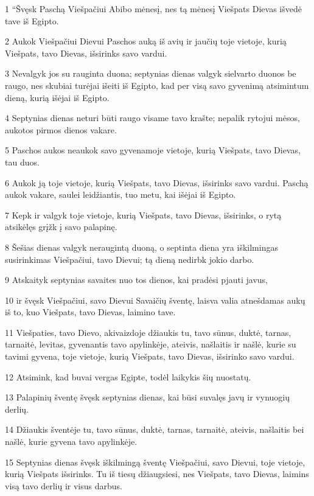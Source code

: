 \par 1 “Švęsk Paschą Viešpačiui Abibo mėnesį, nes tą mėnesį Viešpats Dievas išvedė tave iš Egipto. 
\par 2 Aukok Viešpačiui Dievui Paschos auką iš avių ir jaučių toje vietoje, kurią Viešpats, tavo Dievas, išsirinks savo vardui. 
\par 3 Nevalgyk jos su rauginta duona; septynias dienas valgyk sielvarto duonos be raugo, nes skubiai turėjai išeiti iš Egipto, kad per visą savo gyvenimą atsimintum dieną, kurią išėjai iš Egipto. 
\par 4 Septynias dienas neturi būti raugo visame tavo krašte; nepalik rytojui mėsos, aukotos pirmos dienos vakare. 
\par 5 Paschos aukos neaukok savo gyvenamoje vietoje, kurią Viešpats, tavo Dievas, tau duos. 
\par 6 Aukok ją toje vietoje, kurią Viešpats, tavo Dievas, išsirinks savo vardui. Paschą aukok vakare, saulei leidžiantis, tuo metu, kai išėjai iš Egipto. 
\par 7 Kepk ir valgyk toje vietoje, kurią Viešpats, tavo Dievas, išsirinks, o rytą atsikėlęs grįžk į savo palapinę. 
\par 8 Šešias dienas valgyk neraugintą duoną, o septinta diena yra iškilmingas susirinkimas Viešpačiui, tavo Dievui; tą dieną nedirbk jokio darbo. 
\par 9 Atskaityk septynias savaites nuo tos dienos, kai pradėsi pjauti javus, 
\par 10 ir švęsk Viešpačiui, savo Dievui Savaičių šventę, laisva valia atnešdamas aukų iš to, kuo Viešpats, tavo Dievas, laimino tave. 
\par 11 Viešpaties, tavo Dievo, akivaizdoje džiaukis tu, tavo sūnus, duktė, tarnas, tarnaitė, levitas, gyvenantis tavo apylinkėje, ateivis, našlaitis ir našlė, kurie su tavimi gyvena, toje vietoje, kurią Viešpats, tavo Dievas, išsirinko savo vardui. 
\par 12 Atsimink, kad buvai vergas Egipte, todėl laikykis šių nuostatų. 
\par 13 Palapinių šventę švęsk septynias dienas, kai būsi suvalęs javų ir vynuogių derlių. 
\par 14 Džiaukis šventėje tu, tavo sūnus, duktė, tarnas, tarnaitė, ateivis, našlaitis bei našlė, kurie gyvena tavo apylinkėje. 
\par 15 Septynias dienas švęsk iškilmingą šventę Viešpačiui, savo Dievui, toje vietoje, kurią Viešpats išsirinks. Tu iš tiesų džiaugsiesi, nes Viešpats, tavo Dievas, laimins visą tavo derlių ir visus darbus. 
